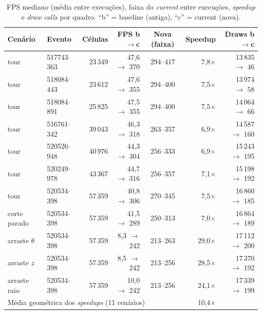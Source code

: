 \documentclass[11pt,a4paper]{article}
\begin{document}
\begin{table}[htbp]
\centering
\caption{FPS mediano (m\'edia entre execu\c{c}\~oes), faixa do \emph{current} entre
execu\c{c}\~oes, \emph{speedup} e \emph{draw calls} por quadro. ``b'' = baseline (antiga),
``c'' = current (nova).}
\label{tab:rtx}
\small
\begin{tabular}{llrrcrr}
\toprule
Cen\'ario & Evento & C\'elulas & FPS b$\to$c & Nova (faixa) & Speedup & Draws b$\to$c \\
\midrule
tour & 517743$\cdot$363 & 23\,349 & 47{,}6 $\to$ 370 & 294--417 & 7{,}8$\times$ & 13\,835 $\to$ 46 \\
tour & 518084$\cdot$443 & 23\,612 & 47{,}6 $\to$ 355 & 294--400 & 7{,}5$\times$ & 13\,974 $\to$ 58 \\
tour & 518084$\cdot$891 & 25\,825 & 47{,}5 $\to$ 355 & 294--400 & 7{,}5$\times$ & 14\,064 $\to$ 66 \\
tour & 516761$\cdot$342 & 39\,043 & 46{,}3 $\to$ 318 & 263--357 & 6{,}9$\times$ & 14\,587 $\to$ 160 \\
tour & 520526$\cdot$948 & 40\,976 & 44{,}3 $\to$ 304 & 256--333 & 6{,}9$\times$ & 15\,243 $\to$ 195 \\
tour & 520249$\cdot$978 & 43\,367 & 44{,}7 $\to$ 316 & 256--357 & 7{,}1$\times$ & 15\,198 $\to$ 192 \\
tour & 520534$\cdot$398 & 57\,359 & 40{,}8 $\to$ 306 & 270--345 & 7{,}5$\times$ & 16\,860 $\to$ 185 \\
corte parado & 520534$\cdot$398 & 57\,359 & 41{,}5 $\to$ 289 & 250--313 & 7{,}0$\times$ & 16\,864 $\to$ 189 \\
arraste $\theta$ & 520534$\cdot$398 & 57\,359 & 8{,}3 $\to$ 242 & 213--263 & 29{,}0$\times$ & 17\,112 $\to$ 200 \\
arraste $z$ & 520534$\cdot$398 & 57\,359 & 8{,}5 $\to$ 242 & 213--256 & 28{,}5$\times$ & 17\,370 $\to$ 192 \\
arraste raio & 520534$\cdot$398 & 57\,359 & 10{,}0 $\to$ 242 & 213--256 & 24{,}1$\times$ & 17\,339 $\to$ 199 \\
\midrule
\multicolumn{5}{l}{M\'edia geom\'etrica dos \emph{speedups} (11 cen\'arios)} & 10{,}4$\times$ & \\
\bottomrule
\end{tabular}
\end{table}
\end{document}
